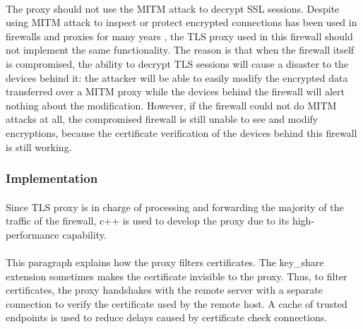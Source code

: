 \documentclass[mscthesis]{usiinfthesis}
\begin{document}
\paragraph{}
The proxy should not use the MITM attack to decrypt SSL sessions. Despite using MITM attack to inspect or protect encrypted connections has been used in firewalls and proxies for many years \citep{fortigate:deepinspection}, the TLS proxy used in this firewall should not implement the same functionality. The reason is that when the firewall itself is compromised, the ability to decrypt TLS sessions will cause a disaster to the devices behind it: the attacker will be able to easily modify the encrypted data transferred over a MITM proxy while the devices behind the firewall will alert nothing about the modification. However, if the firewall could not do MITM attacks at all, the compromised firewall is still unable to see and modify encryptions, because the certificate verification of the devices behind this firewall is still working.
\subsubsection{Implementation}
\paragraph{}
Since TLS proxy is in charge of processing and forwarding the majority of the traffic of the firewall, c++ is used to develop the proxy due to its high-performance capability.
\paragraph{}
This paragraph explains how the proxy filters certificates. The key\_share extension sometimes makes the certificate invisible to the proxy. Thus, to filter certificates, the proxy handshakes with the remote server with a separate connection to verify the certificate used by the remote host. A cache of trusted endpoints is used to reduce delays caused by certificate check connections.
\end{document}
